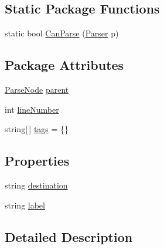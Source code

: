\subsection*{Static Package Functions}
\begin{DoxyCompactItemize}
\item 
static bool \hyperlink{a00120_a1ffeca22df52451120cb362f90fd4e9f}{Can\-Parse} (\hyperlink{a00123}{Parser} p)
\end{DoxyCompactItemize}
\subsection*{Package Attributes}
\begin{DoxyCompactItemize}
\item 
\hyperlink{a00122}{Parse\-Node} \hyperlink{a00122_af313a82103fcc2ff5a177dbb06b92f7b}{parent}
\item 
int \hyperlink{a00122_a18b493382de0fde5b4299c1bd2250075}{line\-Number}
\item 
string\mbox{[}$\,$\mbox{]} \hyperlink{a00122_a58b3a15788fd2d4127d73619dc6d04ae}{tags} = \{\}
\end{DoxyCompactItemize}
\subsection*{Properties}
\begin{DoxyCompactItemize}
\item 
string \hyperlink{a00120_abbe56fba06169901508e6c659f06c236}{destination}
\item 
string \hyperlink{a00120_a7f27d78e67fed6992767e995e70fc468}{label}
\end{DoxyCompactItemize}


\subsection{Detailed Description}


